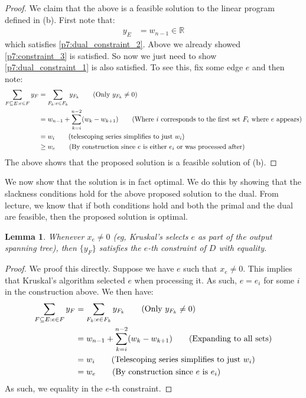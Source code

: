 \documentclass[12pt]{exam}
\newtheorem{lemma}[theorem]{Lemma}
\begin{document}
\begin{questions}
\begin{solution}
\begin{enumerate}[label=(\alph*)]
\begin{proof}
        We claim that the above is a feasible solution to the linear program defined in (b).
        First note that:
        \begin{align*}
          y_E &= w_{n-1} \in \mathbb{R}
        \end{align*}
        which satisfies \ref{p7:dual_constraint_2}. Above we already showed \ref{p7:constraint_3} is satisfied. So now we just need to show \ref{p7:dual_constraint_1} is also satisfied. To see this, fix some edge $e$ and then note:
        \begin{align*}
          \sum_{F \subseteq E: e \in F} y_F &= \sum_{F_k : e \in F_k} y_{F_k} \tag{Only $y_{F_k} \neq 0$} \\
          &= w_{n-1} + \sum_{k=i}^{n-2} (w_{k} - w_{k+1}) \tag{Where $i$ corresponds to the first set $F_i$ where $e$ appears} \\
          &= w_i \tag{telescoping series simplifies to just $w_i$} \\
          &\geq w_e \tag{By construction since $e$ is either $e_i$ or was processed after}
        \end{align*}
        The above shows that the proposed solution is a feasible solution of (b).
      \end{proof}

      We now show that the solution is in fact optimal. We do this by showing that the slackness conditions hold for the above proposed solution to the dual. From lecture, we know that if both conditions hold and both the primal and the dual are feasible, then the proposed solution is optimal.
      \begin{lemma}
      Whenever $x_e \neq 0$ (eg, Kruskal's selects $e$ as part of the output spanning tree), then $\{y_F\}$ satisfies the $e$-th constraint of $D$ with equality.
      \end{lemma}
      \begin{proof}
        We proof this directly. Suppose we have $e$ such that $x_e \neq 0$. This implies that Kruskal's algorithm selected $e$ when processing it. As such, $e = e_i$ for some $i$ in the construction above. We then have:
        \begin{align*}
          \sum_{F \subseteq E: e \in F} y_F &= \sum_{F_k : e \in F_k} y_{F_k} \tag{Only $y_{F_k} \neq 0$} \\
          &= w_{n-1} + \sum_{k=i}^{n-2} (w_{k} - w_{k+1}) \tag{Expanding to all sets}  \\
          &= w_i \tag{Telescoping series simplifies to just $w_i$} \\
          &= w_e \tag{By construction since $e$ is $e_i$}
        \end{align*}
        As such, we equality in the $e$-th constraint.
      \end{proof}


\end{enumerate}
\end{solution}
\end{questions}
\end{document}
